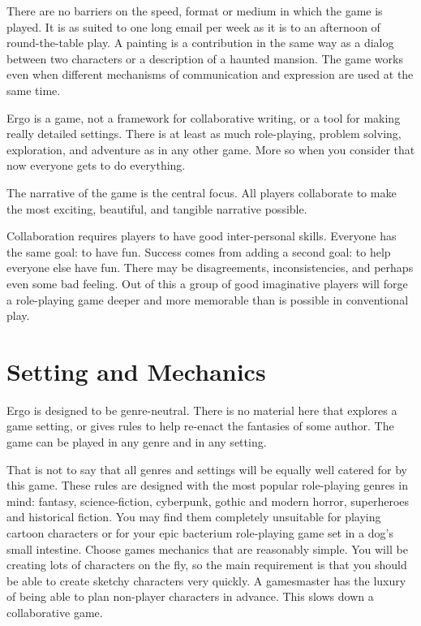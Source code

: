 \documentclass[twoside]{book}
\begin{document}
\begin{enumerate}
\begin{item} There are no barriers on the speed, format or medium in which the
   game is played. It is as suited to one long email per week as it is
   to an afternoon of round-the-table play. A painting is a
   contribution in the same way as a dialog between two characters or
   a description of a haunted mansion. The game works even when
   different mechanisms of communication and expression are used at
   the same time.
\end{item}

\begin{item} Ergo is a game, not a framework for collaborative writing, or a
   tool for making really detailed settings. There is at least as much
   role-playing, problem solving, exploration, and adventure as in any
   other game. More so when you consider that now everyone gets to do
   everything.
\end{item}

\begin{item} The narrative of the game is the central focus. All players
   collaborate to make the most exciting, beautiful, and tangible
   narrative possible.
\end{item}

\begin{item} Collaboration requires players to have good inter-personal
    skills. Everyone has the same goal: to have fun. Success comes
    from adding a second goal: to help everyone else have fun. There
    may be disagreements, inconsistencies, and perhaps even some bad
    feeling. Out of this a group of good imaginative players will
    forge a role-playing game deeper and more memorable than is
    possible in conventional play.
\end{item}
\end{enumerate}

\section{Setting and Mechanics}

Ergo is designed to be genre-neutral. There is no material here that
explores a game setting, or gives rules to help re-enact the fantasies
of some author. The game can be played in any genre and in any
setting.

That is not to say that all genres and settings will be equally well
catered for by this game. These rules are designed with the most
popular role-playing genres in mind: fantasy, science-fiction,
cyberpunk, gothic and modern horror, superheroes and historical
fiction. You may find them completely unsuitable for playing cartoon
characters or for your epic bacterium role-playing game set in a dog's
small intestine. Choose games mechanics that are reasonably
simple. You will be creating lots of characters on the fly, so the
main requirement is that you should be able to create sketchy
characters very quickly. A gamesmaster has the luxury of being able to
plan non-player characters in advance. This slows down a collaborative
game.
\end{document}
